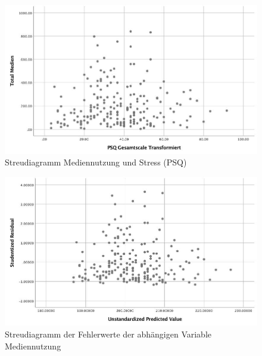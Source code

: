 
\begin{figure}[h]
  \centering
     \includegraphics[scale=0.4]{content/Grafik/Streudiagramm_TotalMedien_PSQ.jpg}
  \captionsetup{margin=80pt}
  \caption{Streudiagramm Mediennutzung und Stress (PSQ)}
  \label{fig:AppStreudiagrammMedienPsq}
\end{figure}

\begin{figure}[h]
  \centering
     \includegraphics[scale=0.4]{content/Grafik/Streudiagramm_Hypo2_GeschaetzteWerteUndResiduen.jpg}
  \captionsetup{margin=80pt}
  \caption{Streudiagramm der Fehlerwerte  der abhängigen Variable Mediennutzung}
  \label{fig:AppStreudiagrammResiduen}
\end{figure}

